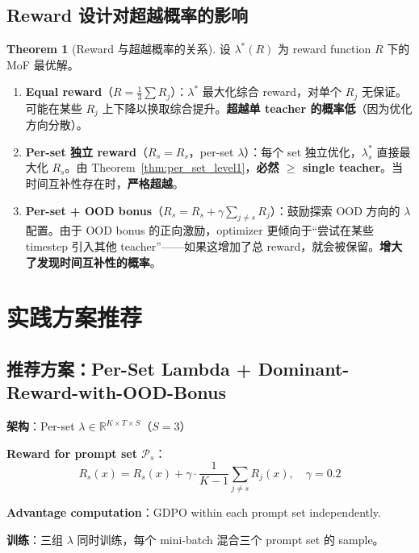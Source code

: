 \documentclass[11pt,a4paper]{article}
\newcommand{\R}{\mathbb{R}}
\newcommand{\reward}{R}
\theoremstyle{definition}
\newtheorem{theorem}{Theorem}
\begin{document}
\subsection{Reward 设计对超越概率的影响}

\begin{theorem}[Reward 与超越概率的关系]
\label{thm:reward_design}
设 $\lambda^*(\reward)$ 为 reward function $\reward$ 下的 MoF 最优解。

\begin{enumerate}[leftmargin=1.5em]
\item \textbf{Equal reward}（$\reward = \frac{1}{3}\sum R_j$）：$\lambda^*$ 最大化综合 reward，对单个 $R_j$ 无保证。可能在某些 $R_j$ 上下降以换取综合提升。\textbf{超越单 teacher 的概率低}（因为优化方向分散）。

\item \textbf{Per-set 独立 reward}（$\reward_s = R_s$，per-set $\lambda$）：每个 set 独立优化，$\lambda^*_s$ 直接最大化 $R_s$。由 Theorem~\ref{thm:per_set_level1}，\textbf{必然 $\geq$ single teacher}。当时间互补性存在时，\textbf{严格超越}。

\item \textbf{Per-set + OOD bonus}（$\reward_s = R_s + \gamma \sum_{j\neq s} R_j$）：鼓励探索 OOD 方向的 $\lambda$ 配置。由于 OOD bonus 的正向激励，optimizer 更倾向于``尝试在某些 timestep 引入其他 teacher''——如果这增加了总 reward，就会被保留。\textbf{增大了发现时间互补性的概率}。
\end{enumerate}
\end{theorem}

\section{实践方案推荐}
\label{sec:recommendation}

\subsection{推荐方案：Per-Set Lambda + Dominant-Reward-with-OOD-Bonus}

\begin{tcolorbox}[colback=green!5, colframe=green!50!black, title=推荐方案]
\textbf{架构}：Per-set $\lambda \in \R^{K \times T \times S}$（$S=3$）

\textbf{Reward for prompt set $\mathcal{P}_s$}：
\begin{equation}
\boxed{
\reward_s(x) = R_s(x) + \gamma \cdot \frac{1}{K-1}\sum_{j \neq s} R_j(x), \quad \gamma = 0.2
}
\end{equation}

\textbf{Advantage computation}：GDPO within each prompt set independently.

\textbf{训练}：三组 $\lambda$ 同时训练，每个 mini-batch 混合三个 prompt set 的 sample。
\end{tcolorbox}
\end{document}
